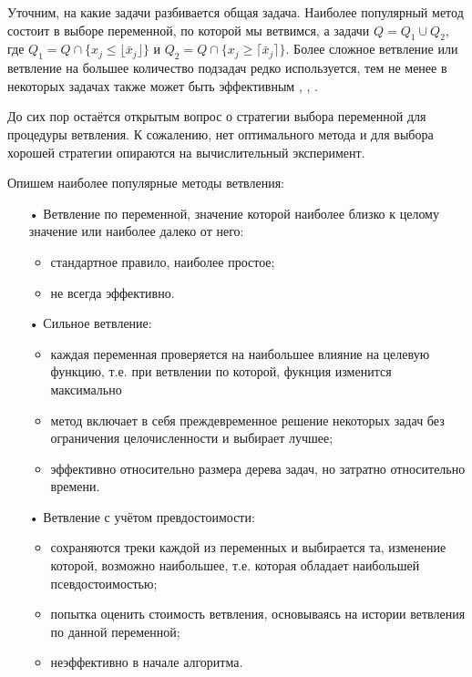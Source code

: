 \documentclass[a4paper,14pt,russian]{extreport}
\begin{document}
\par Уточним, на какие задачи разбивается общая задача. Наиболее популярный метод состоит в выборе переменной, по которой мы ветвимся, а задачи $Q = Q_1 \cup Q_2$, где $Q_1 = Q \cap \{x_j \le \lfloor \bar x_j \rfloor \}$ и $Q_2 = Q \cap \{x_j \ge \lceil \bar x_j \rceil \}$. Более сложное ветвление или ветвление на большее количество подзадач редко используется, тем не менее в некоторых задачах также может быть эффективным \cite{borndoerfer}, \cite{clochard}, \cite{naddef}.
\par До сих пор остаётся открытым вопрос о стратегии выбора переменной для процедуры ветвления. К сожалению, нет оптимального метода и для выбора хорошей стратегии опираются на вычислительный эксперимент. 
\par Опишем наиболее популярные методы ветвления:
  \begin{itemize}
  \item[•] Ветвление по переменной, значение которой наиболее близко к целому значение или наиболее далеко от него:
    \begin{itemize}
    \item стандартное правило, наиболее простое;
    \item не всегда эффективно. 
    \end{itemize}
  \item[•] Сильное ветвление:
    \begin{itemize} 
    \item каждая переменная проверяется на наибольшее влияние на целевую функцию, т.е. при ветвлении по которой, фукнция изменится максимально
    \item метод включает в себя преждевременное решение некоторых задач без ограничения целочисленности и выбирает лучшее;
    \item эффективно относительно размера дерева задач, но затратно относительно времени.
    \end{itemize}
  \item[•] Ветвление с учётом превдостоимости:
    \begin{itemize}
    \item сохраняются треки каждой из переменных и выбирается та, изменение которой, возможно наибольшее, т.е. которая обладает наибольшей псевдостоимостью;
    \item попытка оценить стоимость ветвления, основываясь на истории ветвления по данной переменной;
    \item неэффективно в начале алгоритма.
    \end{itemize}
  \end{itemize}
\end{document}
